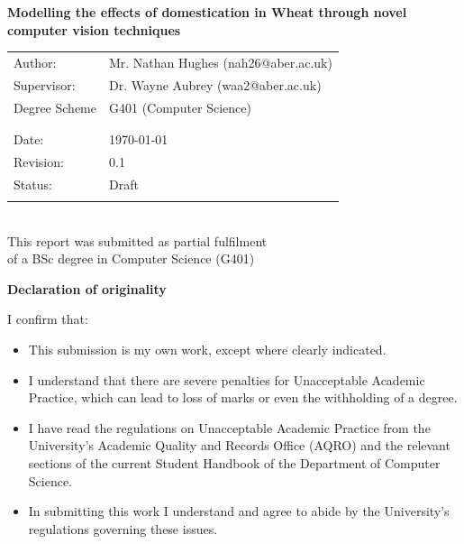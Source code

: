 \documentclass[11pt]{report}
\begin{document}
  \thispagestyle{empty}
  \renewcommand{\headrulewidth}{0pt}
  \begin{center}
    \fontsize{10}{12}
    \selectfont

    \textbf{\huge Modelling the effects of domestication in Wheat through novel computer vision techniques}

    \vspace{0.3in}

    \begin{tabular}[t]{ll}
      Author: & Mr. Nathan Hughes (nah26@aber.ac.uk) \\
      Supervisor: & Dr. Wayne Aubrey (waa2@aber.ac.uk) \\
      Degree Scheme &  G401 \hspace*{0.05in}(Computer Science)\\
      \\
      \\
      Date: & \today \\
      Revision: & 0.1\\
      Status: & Draft\\
      \\
    \end{tabular}
    \\
    \vspace{0.1in}
    This report was submitted as partial fulfilment \\of a BSc degree in Computer Science (G401)
  \end{center}
  \clearpage
  \renewcommand{\headrulewidth}{1pt}

  \thispagestyle{plain}

  \begin{center}
    {\LARGE\bf Declaration of originality}
  \end{center}

  I confirm that:

  \begin{itemize}
  \item{This submission is my own work, except where
      clearly indicated.}

  \item{I understand that there are severe penalties for Unacceptable Academic Practice, which can lead to loss of marks or even the withholding of a degree.}

  \item{I have read the regulations on Unacceptable Academic Practice from the University's Academic Quality and Records Office (AQRO) and the relevant sections of the current Student Handbook of the Department of Computer Science.}

  \item{In submitting this work I understand and agree to abide by the University's regulations governing these issues.}
  \end{itemize}
\end{document}

